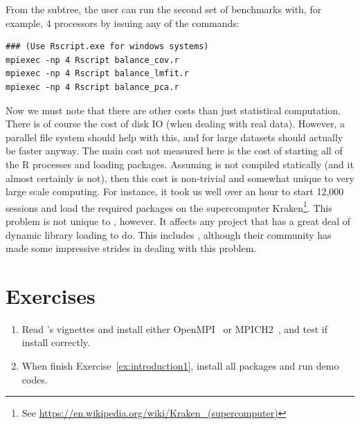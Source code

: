 From the  subtree, the user can run the second set of benchmarks with, for example, 4 processors by issuing any of the commands:
\begin{lstlisting}
### (Use Rscript.exe for windows systems)
mpiexec -np 4 Rscript balance_cov.r
mpiexec -np 4 Rscript balance_lmfit.r
mpiexec -np 4 Rscript balance_pca.r
\end{lstlisting}

Now we must note that there are other costs than just statistical computation.  There is of course the cost of disk IO (when dealing with real data).  However, a parallel file system should help with this, and for large datasets should actually be faster anyway.  The main cost not measured here is the cost of starting all of the R processes and loading packages.  Assuming  is not compiled statically (and it almost certainly is not), then this cost is non-trivial and somewhat unique to very large scale computing.  For instance, it took us well over an hour to start 12,000  sessions and load the required packages on the supercomputer Kraken\footnote{See \url{https://en.wikipedia.org/wiki/Kraken_(supercomputer)}}.  This problem is not unique to , however.  It affects any project that has a great deal of dynamic library loading to do.  This includes , although their community has made some impressive strides in dealing with this problem.




\section{Exercises}
\label{sec:introduction_exercise}

\begin{enumerate}[label=\thechapter-\arabic*]
\item
Read 's vignettes and install either OpenMPI~ or
MPICH2~, and test if install correctly.
\label{ex:introduction1}

\item
When finish Exercise~\ref{ex:introduction1},
install all  packages and run demo codes.
\end{enumerate}

